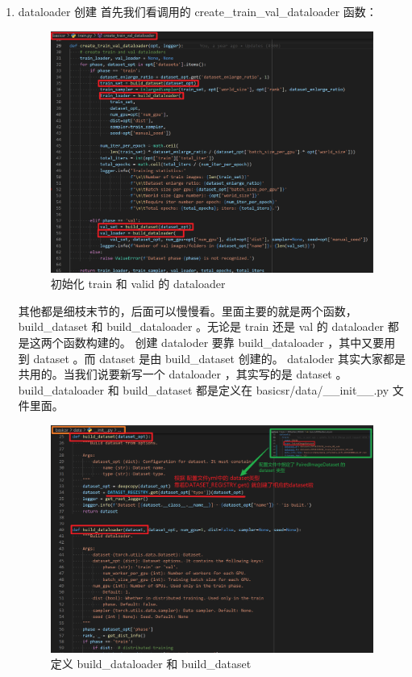 \documentclass[../main.tex]{subfiles}
\begin{document}
\begin{enumerate}

\item dataloader 创建
首先我们看调用的 create\_train\_val\_dataloader 函数：

\begin{figure}[H]
\begin{center}
    \includegraphics[width=0.7\linewidth]{figures/getting_start_9.png}
    \caption{初始化 train 和 valid 的 dataloader}
    \label{fig:getting_start_9}
\end{center}
\vspace{-0.5cm}
\end{figure}

其他都是细枝末节的，后面可以慢慢看。里面主要的就是两个函数， build\_dataset 和 build\_dataloader 。无论是 train 还是 val 的 dataloader 都是这两个函数构建的。
创建 dataloder 要靠 build\_dataloader ，其中又要用到 dataset 。而 dataset 是由 build\_dataset 创建的。 dataloder 其实大家都是共用的。当我们说要新写一个 dataloader ，其实写的是 dataset 。 build\_dataloader 和 build\_dataset 都是定义在 basicsr/data/\_\_init\_\_.py 文件里面。

\begin{figure}[H]
\begin{center}
    \includegraphics[width=0.7\linewidth]{figures/getting_start_10.png}
    \caption{定义 build\_dataloader 和 build\_dataset }
    \label{fig:getting_start_10}
\end{center}
\vspace{-0.5cm}
\end{figure}


\end{enumerate}
\end{document}
